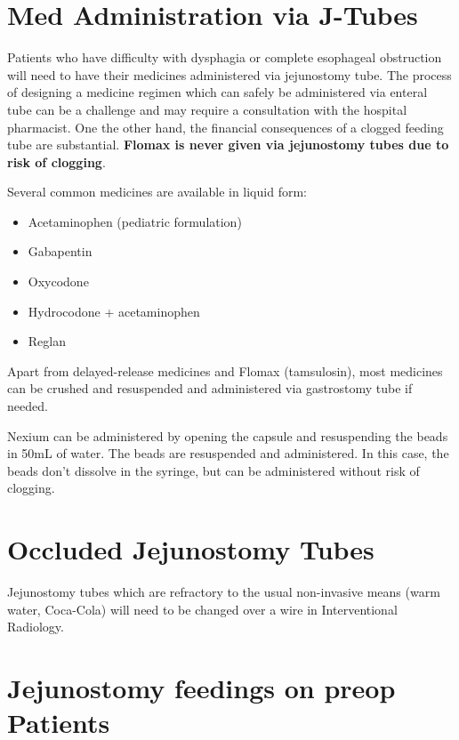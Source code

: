 \documentclass[
  letterpaper,
]{scrbook}
\providecommand{\tightlist}{%
  \setlength{\itemsep}{0pt}\setlength{\parskip}{0pt}}
\begin{document}
\section{Med Administration via
J-Tubes}\label{med-administration-via-j-tubes}

Patients who have difficulty with dysphagia or complete esophageal
obstruction will need to have their medicines administered via
jejunostomy tube. The process of designing a medicine regimen which can
safely be administered via enteral tube can be a challenge and may
require a consultation with the hospital pharmacist. One the other hand,
the financial consequences of a clogged feeding tube are substantial.
\textbf{Flomax is never given via jejunostomy tubes due to risk of
clogging}.

Several common medicines are available in liquid form:

\begin{itemize}
\tightlist
\item
  Acetaminophen (pediatric formulation)
\item
  Gabapentin
\item
  Oxycodone
\item
  Hydrocodone + acetaminophen
\item
  Reglan
\end{itemize}

Apart from delayed-release medicines and Flomax (tamsulosin), most
medicines can be crushed and resuspended and administered via
gastrostomy tube if needed.

Nexium can be administered by opening the capsule and resuspending the
beads in 50mL of water. The beads are resuspended and administered. In
this case, the beads don't dissolve in the syringe, but can be
administered without risk of clogging.

\section{Occluded Jejunostomy Tubes}\label{occluded-jejunostomy-tubes}

Jejunostomy tubes which are refractory to the usual non-invasive means
(warm water, Coca-Cola) will need to be changed over a wire in
Interventional Radiology.

\section{Jejunostomy feedings on preop
Patients}\label{jejunostomy-feedings-on-preop-patients}
\end{document}
